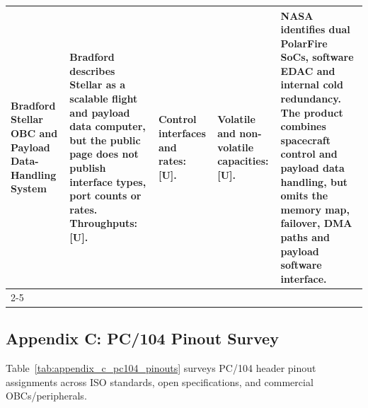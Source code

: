 \documentclass[10pt]{../datasheet}
\let\cite\citep
\begin{document}
\begin{landscape}
\begin{longtable}{|p{3.2cm}|p{4.5cm}|p{4.5cm}|p{4.5cm}|p{5.5cm}|}
    Bradford Stellar OBC and Payload Data-Handling System
    \cite{bradford_stellar_ds, nasa_soa_2026}                          &
    Bradford describes Stellar as a scalable flight and payload data computer,
    but the public page does not publish interface types, port counts or rates.
    Throughputs: [U].                                                  & Control interfaces and rates: [U].                                         & Volatile
    and non-volatile capacities: [U].                                  & NASA identifies dual PolarFire SoCs,
    software EDAC and internal cold redundancy. The product combines spacecraft
    control and payload data handling, but omits the memory map, failover, DMA
    paths and payload software interface.                                                                                                                                                                                                            \\
    \cline{2-5}
                                                                       &                                                                            &                                                  &                                           & \\ \hline\hline
  \end{longtable}
\end{landscape}
\clearpage
\begin{landscape}
  \section{Appendix C: PC/104 Pinout Survey}
  \makeatletter
  \def\@currentlabel{C}
  \makeatother
  \label{sec:appendix_c}

  Table~\ref{tab:appendix_c_pc104_pinouts} surveys PC/104 header pinout assignments across ISO standards, open specifications, and commercial OBCs/peripherals.

  \vspace{1em}
  \renewcommand{\arraystretch}{1.2}
\end{landscape}
\clearpage




\end{document}

